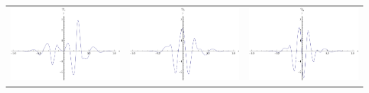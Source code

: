 \documentclass{article}
\begin{document}
\begin{landscape}
\begin{tabular}{ccc}
\includegraphics[width=6.7cm]{cubic_wavelet_4.pdf}& \includegraphics[width=6.7cm]{cubic_wavelet_5.pdf}& \includegraphics[width=6.7cm]{cubic_wavelet_6.pdf} \\
\end{tabular} 
 \end{landscape}
\end{document}
